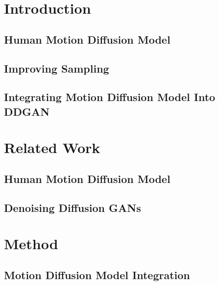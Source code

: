 \documentclass[10pt,twocolumn,letterpaper]{article}
\begin{document}
\section{Introduction}
\label{sec:intro}

\subsection{Human Motion Diffusion Model}

\subsection{Improving Sampling}

\subsection{Integrating Motion Diffusion Model Into DDGAN}


\section{Related Work}
\label{sec:related-work}

\subsection{Human Motion Diffusion Model}

\subsection{Denoising Diffusion GANs}


\section{Method}
\label{sec:method}

\subsection{Motion Diffusion Model Integration}
\end{document}
